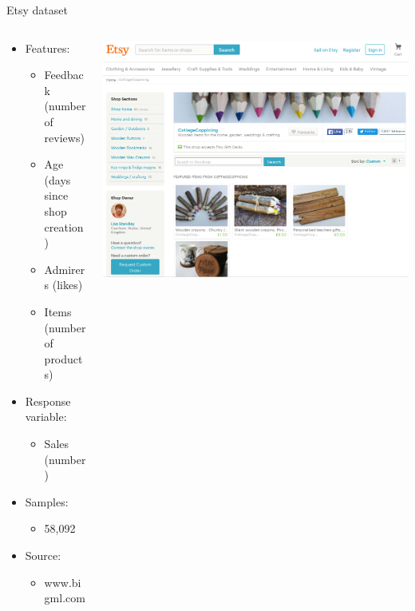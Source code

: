 \begin{frame}{Etsy dataset}
    \begin{columns}
     \begin{column}{.44\textwidth}
        \begin{itemize}
            \item Features:
            \begin{itemize}
                \item Feedback (number of reviews)
                \item Age (days since shop creation)
                \item Admirers (likes)
                \item Items (number of products)
            \end{itemize}
            \item Response variable:
            \begin{itemize}
                \item Sales (number)
            \end{itemize}
            \item Samples:
            \begin{itemize}
                \item 58,092
            \end{itemize}
            \item Source:
            \begin{itemize}
                \item www.bigml.com
            \end{itemize}
        \end{itemize}
     \end{column}

     \begin{column}{.54\textwidth}
        \begin{center}
            \includegraphics[scale=.22]{images/etsy_screenshot}
        \end{center}
     \end{column}
    \end{columns}
\end{frame}


